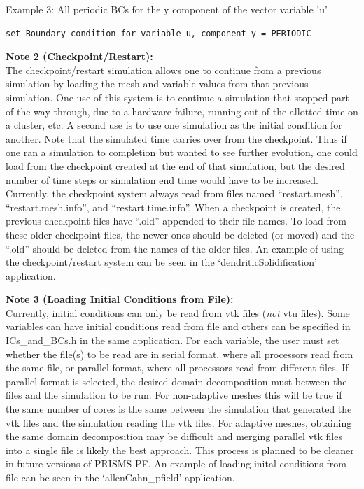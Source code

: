 \documentclass[10pt]{article} %
\begin{document}
Example 3: All periodic BCs for the y component of the vector variable 'u'
\begin{lstlisting}
set Boundary condition for variable u, component y = PERIODIC
\end{lstlisting}

\textbf{Note 2 (Checkpoint/Restart):} \\
The checkpoint/restart simulation allows one to continue from a previous simulation by loading the mesh and variable values from that previous simulation. One use of this system is to continue a simulation that stopped part of the way through, due to a hardware failure, running out of the allotted time on a cluster, etc. A second use is to use one simulation as the initial condition for another. Note that the simulated time carries over from the checkpoint. Thus if one ran a simulation to completion but wanted to see further evolution, one could load from the checkpoint created at the end of that simulation, but the desired number of time steps or simulation end time would have to be increased. Currently, the checkpoint system always read from files named ``restart.mesh'', ``restart.mesh.info'', and ``restart.time.info''. When a checkpoint is created, the previous checkpoint files have ``.old'' appended to their file names. To load from these older checkpoint files, the newer ones should be deleted (or moved) and the ``.old'' should be deleted from the names of the older files. An example of using the checkpoint/restart system can be seen in the `dendriticSolidification' application.

\textbf{Note 3 (Loading Initial Conditions from File):} \\
Currently, initial conditions can only be read from vtk files (\emph{not} vtu files). Some variables can have initial conditions read from file and others can be specified in ICs\_and\_BCs.h in the same application. For each variable, the user must set whether the file(s) to be read are in serial format, where all processors read from the same file, or parallel format, where all processors read from different files. If parallel format is selected, the desired domain decomposition must between the files and the simulation to be run. For non-adaptive meshes this will be true if the same number of cores is the same between the simulation that generated the vtk files and the simulation reading the vtk files. For adaptive meshes, obtaining the same domain decomposition may be difficult and merging parallel vtk files into a single file is likely the best approach. This process is planned to be cleaner in future versions of PRISMS-PF. An example of loading inital conditions from file can be seen in the `allenCahn\_pfield' application.
\end{document}
